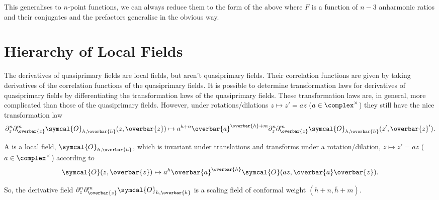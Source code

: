 \documentclass[fleqn]{NotesClass}
\newcommand{\quantumField}[1]{\symcal{#1}}
\begin{document}
    This generalises to \(n\)-point functions, we can always reduce them to the form of the above where \(F\) is a function of \(n - 3\) anharmonic ratios and their conjugates and the prefactors generalise in the obvious way.
    
    \section{Hierarchy of Local Fields}
    The derivatives of quasiprimary fields are local fields, but aren't quasiprimary fields.
    Their correlation functions are given by taking derivatives of the correlation functions of the quasiprimary fields.
    It is possible to determine transformation laws for derivatives of quasiprimary fields by differentiating the transformation laws of the quasiprimary fields.
    These transformation laws are, in general, more complicated than those of the quasiprimary fields.
    However, under rotations/dilations \(z \mapsto z' = az\) (\(a \in \complex^{\times}\)) they still have the nice transformation law
    \begin{equation}
        \partial_z^{n}\partial_{\overbar{z}}^{m} \quantumField{O}_{h,\overbar{h}}(z, \overbar{z}) \mapsto a^{h + n}\overbar{a}^{\overbar{h} + m}\partial_z^{n}\partial_{\overbar{z}}^{m} \quantumField{O}_{h,\overbar{h}}(z', \overbar{z}').
    \end{equation}
    
    \begin{dfn}{}{}
        A  is a local field, \(\quantumField{O}_{h,\overbar{h}}\), which is invariant under translations and transforms under a rotation/dilation, \(z \mapsto z' = az\) (\(a \in \complex^{\times}\)) according to
        \begin{equation}
            \quantumField{O}(z, \overbar{z}) \mapsto a^h \overbar{a}^{\overbar{h}}\quantumField{O}(az, \overbar{a}\overbar{z}).
        \end{equation}
    \end{dfn}
    
    So, the derivative field \(\partial_z^n \partial_{\overbar{z}}^m \quantumField{O}_{h,\overbar{h}}\) is a scaling field of conformal weight \((h + n, \overbar{h} + m)\).
    
\end{document}
